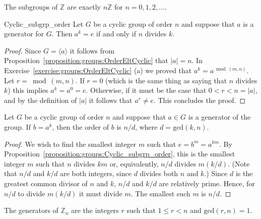 
\begin{corollary}
The subgroups of ${\mathbb Z}$ are exactly $n{\mathbb Z}$ for $n = 0, 1, 2,
\ldots$. 
\end{corollary}
 
 
\begin{prop}{Cyclic_subgrp_order}
Let $G$ be a cyclic group of order $n$ and suppose that $a$ is a
generator for  $G$. Then $a^k=e$ if and only if $n$ divides $k$.
\end{prop}
 
 
\begin{proof}
Since $G=\langle a \rangle$ it follows from Proposition~\ref{proposition:groups:OrderEltCyclic} that $|a|=n$. In Exercise~\ref{exercise:groups:OrderEltCyclic} (a) we proved that  $a^k =  a^{\bmod(m,n)}$. Let $r =\bmod(m,n)$.  If $r=0$ (which is the same thing as saying that $n$ divides $k$) this implies $a^k =  a^{0} = e$. Otherwise, if it must be the case that $0< r< n=|a|$, and by the definition of $|a|$ it follows that $a^r \neq e$. This concludes the proof.
\end{proof}

\begin{prop}{}
Let $G$ be a cyclic group of order $n$ and suppose that $a \in G$ is a
generator of the group.  If $b = a^k$, then the order of $b$ is $n
/d$, where $d = \text{gcd}(k,n)$. 
\end{prop}
 
 
\begin{proof}
We wish to find the smallest integer $m$ such that $e = b^m = a^{km}$.
By Proposition~\ref{proposition:groups:Cyclic_subgrp_order}, this is the smallest integer $m$ such that
$n$ divides $km$ or, equivalently, $n/d$ divides $m(k/d)$. (Note that $n/d$ and $k/d$ are both integers, since $d$ divides both $n$ and $k$.)  Since $d$ is
the greatest common divisor of $n$ and $k$, $n/d$ and $k/d$ are
relatively prime. Hence, for $n/d$ to divide $m(k/d)$ it must divide
$m$.  The smallest such $m$ is $n/d$. 
\end{proof}
 
 
\begin{corollary}
The generators of ${\mathbb Z}_n$ are the integers $r$ such that $1 \leq
r < n$ and $\text{gcd}(r,n) =  1$. 
\end{corollary}
 
